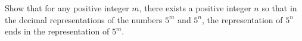 Show that for any positive integer $m$,  there exists a positive integer $n$ so that in the decimal representations of the numbers $5^{m}$ and $5^{n}$,  the representation of $5^{n}$ ends in the representation of $5^{m}$.